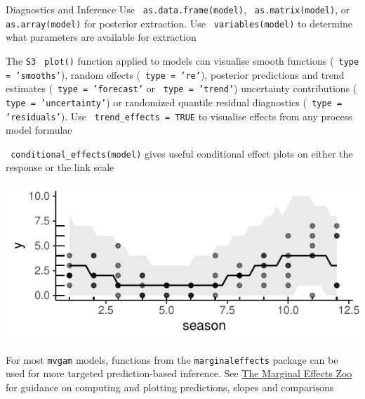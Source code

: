 \documentclass[final,9pt,fleqn]{beamer}\usepackage[]{graphicx}\usepackage[]{xcolor}
\makeatletter
\def\maxwidth{ %
  \ifdim\Gin@nat@width>\linewidth
    \linewidth
  \else
    \Gin@nat@width
  \fi
}
\newenvironment{knitrout}{}{} %
\makeatother
\begin{document}
\begin{frame}[fragile]
\begin{columns}
\begin{column}{0.3\paperwidth}
\begin{block}{{\fontsize{21}{21} \selectfont \color{BrickRed} Diagnostics and Inference}}
\medskip
Use \texttt{\color{Orchid} as.data.frame(model)}, \texttt{\color{Orchid} as.matrix(model)}, or \texttt{\color{Orchid} as.array(model)} for posterior extraction. Use \texttt{\color{Orchid} variables(model)} to determine what parameters are available for extraction

\medskip
The \texttt{S3} \texttt{\color{Orchid} plot()} function applied to models can visualise smooth functions (\texttt{\color{Orchid} type = 'smooths'}), random effects (\texttt{\color{Orchid} type = 're'}), posterior predictions and trend estimates (\texttt{\color{Orchid} type = 'forecast'} or \texttt{\color{Orchid} type = 'trend'}) uncertainty contributions (\texttt{\color{Orchid} type = 'uncertainty'}) or randomized quantile residual diagnostics (\texttt{\color{Orchid} type = 'residuals'}). Use \texttt{\color{Orchid} trend\_effects = TRUE} to visualise effects from any process model formulae

\medskip
\texttt{\color{Orchid} conditional\_effects(model)} gives useful conditional effect plots on either the response or the link scale

\smallskip
\begin{knitrout}
\color{fgcolor}

{\centering \includegraphics[width=\maxwidth]{figure/unnamed-chunk-5-1} 

}


\end{knitrout}

For most \texttt{mvgam} models, functions from the \texttt{marginaleffects} package can be used for more targeted prediction-based inference. See \href{https://marginaleffects.com/}{The Marginal Effects Zoo} for guidance on computing and plotting predictions, slopes and comparisons
\begin{knitrout}
\color{fgcolor}


\end{knitrout}
\end{block}
\end{column}
\end{columns}
\end{frame}
\end{document}
